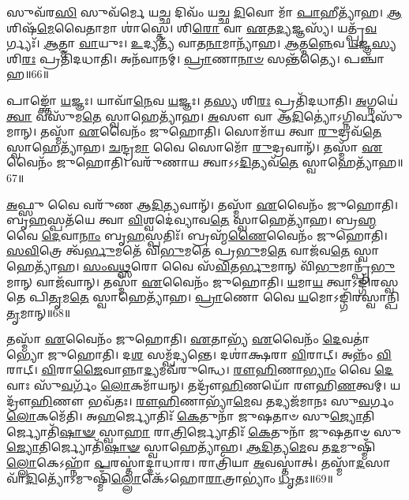 𑌸𑍁𑌵᳴𑌰\-\ul{𑌸𑌿} 𑌸𑍁𑌵᳴𑌰𑍍𑌮𑍇 𑌯\-\ul{𑌚𑍍𑌛} 𑌦𑌿𑌵𑌂᳴ 𑌯𑌚𑍍𑌛 \ul{𑌦𑌿}\-𑌵𑍋 𑌮𑌾᳴ \ul{𑌪𑌾}\-𑌹𑍀𑌤𑍍𑌯𑌾᳴𑌹। 
\-\ul{𑌆}\-𑌶𑌿𑌷᳴\-\ul{𑌮𑍇}\-𑌵𑍈𑌤𑌾𑌮𑌾 𑌶𑌾॑𑌸𑍍𑌤𑍇। 
𑌶𑌿\-\ul{𑌰𑍋} 𑌵𑌾 \ul{𑌏}\-𑌤\-\ul{𑌦𑍍𑌯}\-𑌜𑍍𑌞𑌸𑍍𑌯᳴। 
𑌯𑌤𑍍𑌪𑍍𑌰᳴\-\ul{𑌵}\-𑌰𑍍𑌗𑍍𑌯𑌃᳴। 
\-\ul{𑌆}\-𑌤𑍍𑌮𑌾 \ul{𑌵𑌾}\-𑌯𑍁𑌃। 
\-\ul{𑌉}\-𑌦𑍍𑌯𑌤𑍍𑌯᳴ 𑌵𑌾𑌤\-\ul{𑌨𑌾}\-𑌮𑌾𑌨𑍍𑌯𑌾᳴𑌹। 
\-\ul{𑌆}\-𑌤𑍍𑌮\-\ul{𑌨𑍍𑌨𑍇}\-𑌵 \ul{𑌯}\-𑌜𑍍𑌞\-\ul{𑌸𑍍𑌯} 𑌶𑌿\-\ul{𑌰𑌃} 𑌪𑍍𑌰𑌤𑌿᳴𑌦𑌧𑌾𑌤𑌿। 
𑌅𑌨᳴𑌵𑌾𑌨𑌮𑍍। 
\-\ul{𑌪𑍍𑌰𑌾}\-𑌣𑌾\-\ul{𑌨𑌾}\-\-\ul{𑍞} 𑌸𑌨𑍍𑌤᳴𑌤𑍍𑌯𑍈। 
𑌪𑌞𑍍𑌚𑌾᳴𑌹॥66॥

𑌪𑌾𑌙𑍍𑌕𑍍𑌤𑍋᳴ \ul{𑌯}\-𑌜𑍍𑌞𑌃। 
𑌯𑌾𑌵𑌾᳴\-\ul{𑌨𑍇}\-𑌵 \ul{𑌯}\-𑌜𑍍𑌞𑌃। 
𑌤\-\ul{𑌸𑍍𑌯} 𑌶𑌿\-\ul{𑌰𑌃} 𑌪𑍍𑌰𑌤𑌿᳴𑌦𑌧𑌾𑌤𑌿। 
\-\ul{𑌅}\-𑌗𑍍𑌨𑌯𑍇॑ \ul{𑌤𑍍𑌵𑌾} 𑌵𑌸𑍁᳴𑌮\-\ul{𑌤𑍇} 𑌸𑍍𑌵𑌾𑌹𑍇𑌤𑍍𑌯𑌾᳴𑌹। 
\-\ul{𑌅}\-𑌸𑍗 𑌵𑌾 𑌆᳴\-\ul{𑌦𑌿}\-𑌤𑍍𑌯𑍋॑\-𑌽𑌗𑍍𑌨𑌿𑌰𑍍𑌵𑌸𑍁᳴\-𑌮𑌾𑌨𑍍। 
𑌤𑌸𑍍𑌮𑌾᳴ \ul{𑌏}\-𑌵𑍈𑌨𑌂᳴ 𑌜𑍁𑌹𑍋𑌤𑌿। 
𑌸𑍋𑌮𑌾᳴𑌯 𑌤𑍍𑌵𑌾 \ul{𑌰𑍁}\-𑌦𑍍𑌰𑌵᳴\-\ul{𑌤𑍇} 𑌸𑍍𑌵𑌾𑌹𑍇𑌤𑍍𑌯𑌾᳴𑌹। 
\-\ul{𑌚}\-𑌨𑍍𑌦𑍍𑌰\-\ul{𑌮𑌾} 𑌵𑍈 𑌸𑍋𑌮𑍋᳴ \ul{𑌰𑍁}\-𑌦𑍍𑌰𑌵𑌾𑌨𑍍᳴। 
𑌤𑌸𑍍𑌮𑌾᳴ \ul{𑌏}\-𑌵𑍈𑌨𑌂᳴ 𑌜𑍁𑌹𑍋𑌤𑌿। 
𑌵𑌰𑍁᳴𑌣𑌾𑌯 𑌤𑍍𑌵𑌾𑌽𑌽\-\ul{𑌦𑌿}\-𑌤𑍍𑌯𑌵᳴\-\ul{𑌤𑍇} 𑌸𑍍𑌵𑌾𑌹𑍇𑌤𑍍𑌯𑌾᳴𑌹॥67॥

\-\ul{𑌅}\-𑌫𑍍𑌸𑍁 𑌵𑍈 𑌵𑌰𑍁᳴𑌣 𑌆\-\ul{𑌦𑌿}\-𑌤𑍍𑌯𑌵𑌾𑌨𑍍᳴। 
𑌤𑌸𑍍𑌮𑌾᳴ \ul{𑌏}\-𑌵𑍈𑌨𑌂᳴ 𑌜𑍁𑌹𑍋𑌤𑌿। 
𑌬𑍃\-\ul{𑌹}\-𑌸𑍍𑌪𑌤᳴𑌯𑍇 𑌤𑍍𑌵𑌾 \ul{𑌵𑌿}\-𑌶𑍍𑌵𑌦𑍇॑𑌵𑍍𑌯𑌾𑌵\-\ul{𑌤𑍇} 𑌸𑍍𑌵𑌾𑌹𑍇𑌤𑍍𑌯𑌾᳴𑌹। 
𑌬𑍍𑌰\-\ul{𑌹𑍍𑌮} 𑌵𑍈 \ul{𑌦𑍇}\-𑌵𑌾\-\ul{𑌨𑌾𑌂} 𑌬𑍃\-\ul{𑌹}\-𑌸𑍍𑌪𑌤𑌿𑌃᳴। 
𑌬𑍍𑌰𑌹𑍍𑌮᳴\-\ul{𑌣𑍈}\-𑌵𑍈𑌨𑌂᳴ 𑌜𑍁𑌹𑍋𑌤𑌿। 
\-\ul{𑌸}\-\-\ul{𑌵𑌿}\-𑌤𑍍𑌰𑍇 𑌤𑍍𑌵᳴\-\ul{𑌰𑍍𑌭𑍁}\-𑌮𑌤𑍇᳴ 𑌵𑌿\-\ul{𑌭𑍁}\-𑌮𑌤𑍇॑ 𑌪𑍍𑌰\-\ul{𑌭𑍁}\-𑌮\-\ul{𑌤𑍇} 𑌵𑌾𑌜᳴𑌵\-\ul{𑌤𑍇} 𑌸𑍍𑌵𑌾𑌹𑍇𑌤𑍍𑌯𑌾᳴𑌹। 
\-\ul{𑌸𑌂}\-\-\ul{𑌵}\-\-\ul{𑌥𑍍𑌸}\-𑌰𑍋 𑌵𑍈 𑌸᳴\-\ul{𑌵𑌿}\-𑌤\-\ul{𑌰𑍍𑌭𑍁}\-𑌮𑌾𑌨𑍍 𑌵𑌿᳴\-\ul{𑌭𑍁}\-𑌮𑌾𑌨𑍍𑌪𑍍𑌰᳴\-\ul{𑌭𑍁}\-𑌮𑌾𑌨𑍍 𑌵𑌾𑌜᳴𑌵𑌾𑌨𑍍। 
𑌤𑌸𑍍𑌮𑌾᳴ \ul{𑌏}\-𑌵𑍈𑌨𑌂᳴ 𑌜𑍁𑌹𑍋𑌤𑌿। 
\-\ul{𑌯}\-𑌮𑌾\-\ul{𑌯} 𑌤𑍍𑌵𑌾𑌽𑌙𑍍𑌗𑌿᳴𑌰𑌸𑍍𑌵𑌤𑍇 𑌪𑌿\-\ul{𑌤𑍃}\-𑌮\-\ul{𑌤𑍇} 𑌸𑍍𑌵𑌾𑌹𑍇𑌤𑍍𑌯𑌾᳴𑌹। 
\-\ul{𑌪𑍍𑌰𑌾}\-𑌣𑍋 𑌵𑍈 \ul{𑌯}\-𑌮𑍋𑌽𑌙𑍍𑌗𑌿᳴𑌰𑌸𑍍𑌵𑌾𑌨𑍍𑌪𑌿\-\ul{𑌤𑍃}\-𑌮𑌾𑌨𑍍॥68॥

𑌤𑌸𑍍𑌮𑌾᳴ \ul{𑌏}\-𑌵𑍈𑌨𑌂᳴ 𑌜𑍁𑌹𑍋𑌤𑌿। 
\-\ul{𑌏}\-𑌤𑌾𑌭𑍍𑌯᳴ \ul{𑌏}\-𑌵𑍈𑌨𑌂᳴ \ul{𑌦𑍇}\-𑌵𑌤𑌾॑𑌭𑍍𑌯𑍋 𑌜𑍁𑌹𑍋𑌤𑌿। 
𑌦\-\ul{𑌶} 𑌸𑌮𑍍𑌪᳴𑌦𑍍𑌯𑌨𑍍𑌤𑍇। 
𑌦𑌶𑌾॑𑌕𑍍𑌷𑌰𑌾 \ul{𑌵𑌿}\-𑌰𑌾𑌟𑍍। 
𑌅𑌨𑍍𑌨𑌂᳴  \ul{𑌵𑌿}\-𑌰𑌾𑌟𑍍। 
\-\ul{𑌵𑌿}\-𑌰𑌾\-\ul{𑌜𑍈}\-𑌵𑌾𑌨𑍍𑌨𑌾\-\ul{𑌦𑍍𑌯}\-𑌮𑌵᳴𑌰𑍁𑌨𑍍𑌧𑍇। 
\-\ul{𑌰𑍗}\-\-\ul{𑌹𑌿}\-𑌣𑌾\-\ul{𑌭𑍍𑌯𑌾𑌂} 𑌵𑍈 \ul{𑌦𑍇}\-𑌵𑌾𑌃 𑌸𑍁᳴\-\ul{𑌵}\-𑌰𑍍𑌗𑌂᳴ \ul{𑌲𑍋}\-𑌕𑌮𑌾᳴𑌯𑌨𑍍। 
𑌤𑌦𑍍𑌰𑍗᳴\-\ul{𑌹𑌿}\-𑌣𑌯𑍋᳴ 𑌰𑍗𑌹𑌿\-\ul{𑌣}\-𑌤𑍍𑌵𑌮𑍍। 
𑌯𑌦𑍍𑌰𑍗᳴\-\ul{𑌹𑌿}\-𑌣𑍗 𑌭𑌵᳴𑌤𑌃। 
\-\ul{𑌰𑍗}\-\-\ul{𑌹𑌿}\-𑌣𑌾𑌭𑍍𑌯𑌾᳴\-\ul{𑌮𑍇}\-𑌵 𑌤𑌦𑍍𑌯𑌜᳴𑌮𑌾𑌨𑌃 𑌸𑍁\-\ul{𑌵}\-𑌰𑍍𑌗𑌂 \ul{𑌲𑍋}\-𑌕𑌮𑍇᳴𑌤𑌿। 
𑌅\-\ul{𑌹}\-𑌰𑍍𑌜𑍍𑌯𑍋𑌤𑌿𑌃᳴ \ul{𑌕𑍇}\-𑌤𑍁𑌨𑌾᳴ 𑌜𑍁𑌷𑌤𑌾𑍞 𑌸𑍁\-\ul{𑌜𑍍𑌯𑍋}\-𑌤𑌿𑌰𑍍𑌜𑍍𑌯𑍋𑌤𑌿᳴\-\ul{𑌷𑌾}\-\-\ul{𑍟} 𑌸𑍍𑌵𑌾\-\ul{𑌹𑌾} 𑌰𑌾\-\ul{𑌤𑍍𑌰𑌿}\-𑌰𑍍𑌜𑍍𑌯𑍋𑌤𑌿𑌃᳴ \ul{𑌕𑍇}\-𑌤𑍁𑌨𑌾᳴ 𑌜𑍁𑌷𑌤𑌾𑍞 𑌸𑍁\-\ul{𑌜𑍍𑌯𑍋}\-𑌤𑌿𑌰𑍍𑌜𑍍𑌯𑍋𑌤𑌿᳴\-\ul{𑌷𑌾}\-\-\ul{𑍟} 𑌸𑍍𑌵𑌾𑌹𑍇𑌤𑍍𑌯𑌾᳴𑌹। 
\-\ul{𑌆}\-\-\ul{𑌦𑌿}\-𑌤𑍍𑌯\-\-\ul{𑌮𑍇}\-𑌵 𑌤\-\ul{𑌦}\-𑌮𑍁𑌷𑍍𑌮𑌿𑌁᳴\-\ul{𑌲𑍍𑌲𑍋}\-𑌕𑍇𑌽𑌹𑍍𑌨𑌾᳴ \ul{𑌪}\-𑌰𑌸𑍍𑌤𑌾॑𑌦𑍍𑌦𑌾𑌧𑌾𑌰। 
𑌰𑌾𑌤𑍍𑌰𑌿᳴𑌯𑌾 \ul{𑌅}\-𑌵𑌸𑍍𑌤𑌾॑𑌤𑍍। 
𑌤𑌸𑍍𑌮𑌾᳴\-\ul{𑌦}\-𑌸𑌾𑌵𑌾᳴\-\ul{𑌦𑌿}\-𑌤𑍍𑌯𑍋᳴𑌽𑌮𑍁𑌷𑍍𑌮𑌿𑌁᳴\-\ul{𑌲𑍍𑌲𑍋}\-𑌕𑍇᳴𑌽𑌹𑍋\-\ul{𑌰𑌾}\-𑌤𑍍𑌰𑌾𑌭𑍍𑌯𑌾𑌂॑ \ul{𑌧𑍃}\-𑌤𑌃॥69॥
\anuvakamend[\-\ul{𑌮}\-\-\ul{𑌨𑍁}\-\-\ul{𑌷𑍍𑌯}\-\-\ul{𑌨𑌾}\-𑌮𑌾𑌨𑌿᳴ \ul{𑌪}\-𑌶𑌵𑌃᳴ 𑌸𑍀\-\ul{𑌦}\-𑌤𑍍𑌵𑌿\-\ul{𑌤𑍍𑌯𑌾}\-𑌹𑍇\-\ul{𑌨𑍍𑌦𑍍𑌰𑌾}\-𑌯𑍇𑌤𑍍𑌯𑌾᳴𑌹𑌾𑌰𑍍𑌧𑌯𑌤𑌿 𑌘𑍍𑌨𑌨𑍍𑌤𑌿 𑌗𑍃\-\ul{𑌹𑍍𑌣𑌾}\-𑌤𑍍𑌯𑌹𑌿𑍞᳴𑌸𑌾\-\ul{𑌯𑍈} 𑌪𑌞𑍍𑌚𑌾᳴𑌽𑌹𑌾\-\ul{𑌦𑌿}\-𑌤𑍍𑌯𑌵᳴\-\ul{𑌤𑍇} 𑌸𑍍𑌵𑌾𑌹𑍇𑌤𑍍𑌯𑌾᳴𑌹 𑌪𑌿\-\ul{𑌤𑍃}\-𑌮𑌾𑌨𑍇᳴𑌤𑌿 \ul{𑌚}\-𑌤𑍍𑌵𑌾𑌰𑌿᳴ 𑌚]

